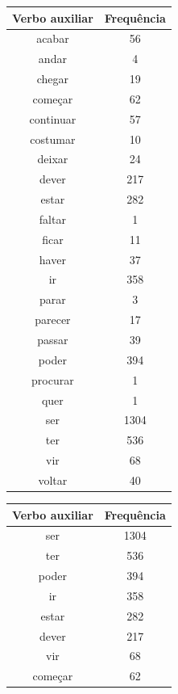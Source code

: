 \documentclass[output=paper,colorlinks,citecolor=brown]{langscibook}
\begin{document}
			\begin{table}[]
				\parbox{.45\linewidth}{
					\centering
					\begin{tabular}{|c|c|}
						\hline
						\textbf{Verbo auxiliar} & \textbf{Frequência} \\\hline
							acabar & 56\\\hline
							andar & 4\\\hline
							chegar & 19\\\hline
							começar & 62\\\hline
							continuar & 57\\\hline
							costumar & 10\\\hline
							deixar & 24\\\hline
							dever & 217\\\hline
							estar & 282\\\hline
							faltar & 1\\\hline
							ficar & 11\\\hline
							haver & 37\\\hline
							ir & 358\\\hline
							parar & 3\\\hline
							parecer & 17\\\hline
							passar & 39\\\hline
							poder & 394\\\hline
							procurar & 1\\\hline
							quer & 1\\\hline
							ser & 1304\\\hline
							ter & 536\\\hline
							vir & 68\\\hline
							voltar & 40\\\hline
					\end{tabular}
				}
				\hfill
				\parbox{.45\linewidth}{
					\centering
					\begin{tabular}{|c|c|}
						\hline
						\textbf{Verbo auxiliar} & \textbf{Frequência} \\\hline
							ser & 1304\\\hline
							ter & 536\\\hline
							poder & 394\\\hline
							ir & 358\\\hline
							estar & 282\\\hline
							dever & 217\\\hline
							vir & 68\\\hline
							começar & 62\\\hline

\end{tabular}}
\end{table}
\end{document}
